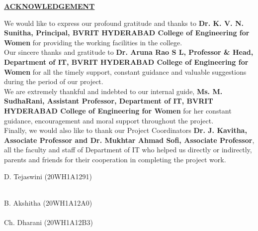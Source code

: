 \documentclass[12pt, English]{article}
\begin{document}
\begin{titlepage}
\begin{center}
\textbf{\normalsize \underline{ACKNOWLEDGEMENT}}\\
\end{center}
\vspace*{0.2in}
\begin{normalsize}
We would like to express our profound gratitude and thanks to \textbf{Dr. K. V. N. Sunitha, Principal,
BVRIT HYDERABAD College of Engineering for Women} for providing the working facilities in the
college.\\
\newline
Our sincere thanks and gratitude to \textbf{Dr. Aruna Rao S L, Professor \& Head, Department of IT,
BVRIT HYDERABAD College of Engineering for Women} for all the timely support, constant guidance
and valuable suggestions during the period of our project.\\
\newline
We are extremely thankful and indebted to our internal guide, \textbf{Ms. M. SudhaRani, Assistant
Professor, Department of IT, BVRIT HYDERABAD College of Engineering for Women} for her constant
guidance, encouragement and moral support throughout the project.\\
\newline
Finally, we would also like to thank our Project Coordinators \textbf{Dr. J. Kavitha, Associate Professor and Dr. Mukhtar Ahmad Sofi, Associate Professor}, all the faculty and staff of Department of IT who helped us directly or indirectly, parents and friends for their cooperation in completing the project work.
\end{normalsize}


\raggedleft
\vspace*{0.5in}
\begin{normalsize}
{ D. Tejaswini (20WH1A1291)}\\ \\
\vspace*{0.25in}
\raggedleft

{ B. Akshitha (20WH1A12A0)}\\ \\
\vspace*{0.25in}
\raggedleft
{ Ch. Dharani (20WH1A12B3)}\\\\
\vspace*{0.25in}
\raggedleft
\end{normalsize}
\end{titlepage}
\end{document}
